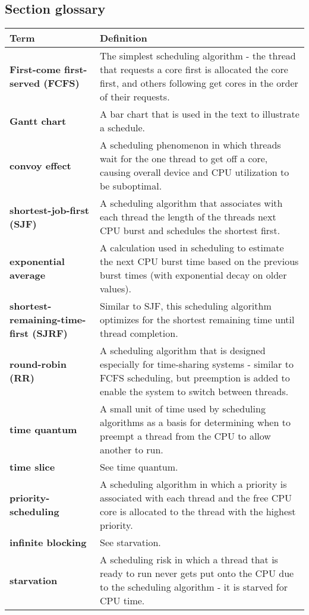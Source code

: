 \subsection*{Section glossary}
\centering
\begin{tabular}{>{\raggedright}p{} >{\raggedright\arraybackslash}p{}}
\toprule
\textbf{Term} & \textbf{Definition} \\
\midrule
\textbf{First-come first-served (FCFS)} & The simplest scheduling algorithm - the thread that requests a core first is allocated the core first, and others following get cores in the order of their requests. \\
\textbf{Gantt chart} & A bar chart that is used in the text to illustrate a schedule. \\
\textbf{convoy effect} & A scheduling phenomenon in which threads wait for the one thread to get off a core, causing overall device and CPU utilization to be suboptimal. \\
\textbf{shortest-job-first (SJF)} & A scheduling algorithm that associates with each thread the length of the threads next CPU burst and schedules the shortest first. \\
\textbf{exponential average} & A calculation used in scheduling to estimate the next CPU burst time based on the previous burst times (with exponential decay on older values). \\
\textbf{shortest-remaining-time-first (SJRF)} & Similar to SJF, this scheduling algorithm optimizes for the shortest remaining time until thread completion. \\
\textbf{round-robin (RR)} & A scheduling algorithm that is designed especially for time-sharing systems - similar to FCFS scheduling, but preemption is added to enable the system to switch between threads. \\
\textbf{time quantum} & A small unit of time used by scheduling algorithms as a basis for determining when to preempt a thread from the CPU to allow another to run. \\
\textbf{time slice} & See time quantum. \\
\textbf{priority-scheduling} & A scheduling algorithm in which a priority is associated with each thread and the free CPU core is allocated to the thread with the highest priority. \\
\textbf{infinite blocking} & See starvation. \\
\textbf{starvation} & A scheduling risk in which a thread that is ready to run never gets put onto the CPU due to the scheduling algorithm - it is starved for CPU time. \\

\end{tabular}

